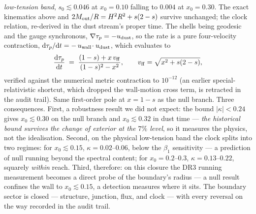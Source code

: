 \documentclass[11pt]{article}
\begin{document}
\emph{low-tension band}, $s_0 \lesssim 0.046$ at $x_0 = 0.10$ falling to $0.004$ at $x_0 = 0.30$.
The exact kinematics above and $2M_{\rm out}/R = H^2R^2 + s(2-s)$ survive unchanged; the clock
relation, re-derived in the dust stream's proper time. The shells being geodesic and the gauge
synchronous, $\nabla\tau_p = -u_{\rm dust}$, so the rate is a pure four-velocity contraction,
$\mathrm{d}\tau_p/\mathrm{d}t = -\,u_{\rm wall}\!\cdot u_{\rm dust}$, which evaluates to
\[
\frac{\mathrm{d}\tau_p}{\mathrm{d}t} \;=\; \frac{(1-s) + x\,v_{\rm ff}}{(1-s)^2 - x^2},
\qquad v_{\rm ff} = \sqrt{x^2 + s(2-s)},
\]
verified against the numerical metric contraction to $10^{-12}$ (an earlier special-relativistic
shortcut, which dropped the wall-motion cross term, is retracted in the audit trail). Same
first-order pole at $x = 1-s$ as the null branch. Three consequences. First, a robustness
result we did not expect: the bound $|\kappa| < 0.24$ gives $x_0 \lesssim 0.30$ on the null
branch and $x_0 \lesssim 0.32$ in dust time --- \emph{the historical bound survives the change of
exterior at the $7\%$ level}, so it measures the physics, not the idealisation. Second, on the
physical low-tension band the clock splits into two regimes: for $x_0 \lesssim 0.15$,
$\kappa = 0.02$--$0.06$, below the $\beta_1$ sensitivity --- a prediction of null running beyond
the spectral content; for $x_0 = 0.2$--$0.3$, $\kappa = 0.13$--$0.22$, squarely \emph{within}
reach. Third, therefore: on this closure the DR3 running measurement becomes a direct probe of
the boundary's radius --- a null result confines the wall to $x_0 \lesssim 0.15$, a detection
measures where it sits. The boundary sector is closed --- structure, junction, flux, and clock ---
with every reversal on the way recorded in the audit trail.
\end{document}
